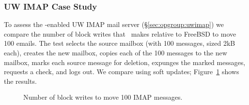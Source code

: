 \subsubsection {UW IMAP Case Study}
\label{sec:evaluation:uwimap}
To assess the \opgroup-enabled UW IMAP mail server
(\S\ref{sec:opgroup:uwimap}) we compare the number of block writes
that \Kudos\ makes relative to FreeBSD to move 100 emails. The test
selects the source mailbox (with 100 messages, sized 2kB each),
creates the new mailbox, copies each of the 100 messages to the new
mailbox, marks each source message for deletion, expunges the marked
messages, requests a check, and logs out. We compare using soft updates;
Figure~\ref{fig:imap-compare} shows the results.
%

\begin{figure}[htb]
\caption{\label{fig:imap-compare} Number of block writes to move 100
  IMAP messages.}
\end{figure}
